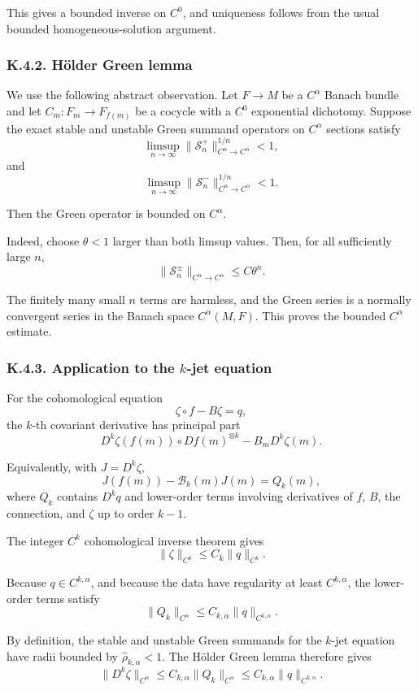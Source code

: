 \documentclass[12pt,a4paper]{article}
\theoremstyle{plain}
\numberwithin{equation}{section}
\numberwithin{theorem}{section}
\begin{document}
This gives a bounded inverse on $C^0$, and uniqueness follows from the usual bounded homogeneous-solution argument.

\subsubsection{K.4.2. H\"older Green lemma}

We use the following abstract observation. Let $F\to M$ be a $C^\alpha$ Banach bundle and let $C_m:F_m\to F_{f(m)}$ be a cocycle with a $C^0$ exponential dichotomy. Suppose the exact stable and unstable Green summand operators on $C^\alpha$ sections satisfy
\[
\limsup_{n\to\infty}
\|\mathcal S_n^+\|_{C^\alpha\to C^\alpha}^{1/n}<1,
\]
and
\[
\limsup_{n\to\infty}
\|\mathcal S_n^-\|_{C^\alpha\to C^\alpha}^{1/n}<1.
\]

Then the Green operator is bounded on $C^\alpha$.

Indeed, choose $\theta<1$ larger than both limsup values. Then, for all sufficiently large $n$,
\[
\|\mathcal S_n^\pm\|_{C^\alpha\to C^\alpha}
\le
C\theta^n.
\]

The finitely many small $n$ terms are harmless, and the Green series is a normally convergent series in the Banach space $C^\alpha(M,F)$. This proves the bounded $C^\alpha$ estimate.

\subsubsection{K.4.3. Application to the $k$-jet equation}

For the cohomological equation
\[
\zeta\circ f-B\zeta=q,
\]
the $k$-th covariant derivative has principal part
\[
D^k\zeta(f(m))
\circ Df(m)^{\otimes k}
-
B_mD^k\zeta(m).
\]

Equivalently, with $J=D^k\zeta$,
\[
J(f(m))-\mathscr B_k(m)J(m)=Q_k(m),
\]
where $Q_k$ contains $D^kq$ and lower-order terms involving derivatives of $f$, $B$, the connection, and $\zeta$ up to order $k-1$.

The integer $C^k$ cohomological inverse theorem gives
\[
\|\zeta\|_{C^k}
\le
C_k\|q\|_{C^k}.
\]

Because $q\in C^{k,\alpha}$, and because the data have regularity at least $C^{k,\alpha}$, the lower-order terms satisfy
\[
\|Q_k\|_{C^\alpha}
\le
C_{k,\alpha}\|q\|_{C^{k,\alpha}}.
\]

By definition, the stable and unstable Green summands for the $k$-jet equation have radii bounded by $\widehat\rho_{k,\alpha}<1$. The H\"older Green lemma therefore gives
\[
\|D^k\zeta\|_{C^\alpha}
\le
C_{k,\alpha}\|Q_k\|_{C^\alpha}
\le
C_{k,\alpha}
\|q\|_{C^{k,\alpha}}.
\]
\end{document}
